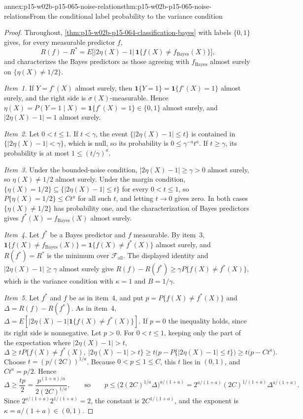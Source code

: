 \begin{annexitem}{annex:p15-w02b-p15-065-noise-relations}{thm:p15-w02b-p15-065-noise-relations}{From the conditional label probability to the variance condition}
\begin{proof}
Throughout, \cref{thm:p15-w02b-p15-064-classification-bayes} with labels
\(\{0,1\}\) gives, for every measurable predictor \(f\),
\begin{equation*}
 R(f)-R^{*}=E\bigl[|2\eta(X)-1|\,\mathbf1\{f(X)\ne f_{\mathrm{Bayes}}(X)\}\bigr],
\end{equation*}
and characterizes the Bayes predictors as those agreeing with
\(f_{\mathrm{Bayes}}\) almost surely on \(\{\eta(X)\ne1/2\}\).

\emph{Item~1.} If \(Y=f^{\circ}(X)\) almost surely, then
\(\mathbf1\{Y=1\}=\mathbf1\{f^{\circ}(X)=1\}\) almost surely, and the right
side is \(\sigma(X)\)-measurable. Hence
\(\eta(X)=P(Y=1\mid X)=\mathbf1\{f^{\circ}(X)=1\}\in\{0,1\}\) almost
surely, and \(|2\eta(X)-1|=1\) almost surely.

\emph{Item~2.} Let \(0<t\leq1\). If \(t<\gamma\), the event
\(\{|2\eta(X)-1|\leq t\}\) is contained in \(\{|2\eta(X)-1|<\gamma\}\),
which is null, so its probability is \(0\leq\gamma^{-a}t^{a}\). If
\(t\geq\gamma\), its probability is at most \(1\leq(t/\gamma)^{a}\).

\emph{Item~3.} Under the bounded-noise condition,
\(|2\eta(X)-1|\geq\gamma>0\) almost surely, so \(\eta(X)\ne1/2\) almost
surely. Under the margin condition,
\(\{\eta(X)=1/2\}\subseteq\{|2\eta(X)-1|\leq t\}\) for every
\(0<t\leq1\), so \(P\{\eta(X)=1/2\}\leq Ct^{a}\) for all such \(t\), and
letting \(t\to0\) gives zero. In both cases \(\{\eta(X)\ne1/2\}\) has
probability one, and the characterization of Bayes predictors gives
\(f^{*}(X)=f_{\mathrm{Bayes}}(X)\) almost surely.

\emph{Item~4.} Let \(f^{*}\) be a Bayes predictor and \(f\) measurable.
By item~3, \(\mathbf1\{f(X)\ne f_{\mathrm{Bayes}}(X)\}=
\mathbf1\{f(X)\ne f^{*}(X)\}\) almost surely, and \(R(f^{*})=R^{*}\) is
the minimum over \(\mathcal F_{\mathrm{all}}\). The displayed identity and
\(|2\eta(X)-1|\geq\gamma\) almost surely give
\(R(f)-R(f^{*})\geq\gamma P\{f(X)\ne f^{*}(X)\}\), which is the variance
condition with \(\kappa=1\) and \(B=1/\gamma\).

\emph{Item~5.} Let \(f^{*}\) and \(f\) be as in item~4, and put
\(p=P\{f(X)\ne f^{*}(X)\}\) and \(\Delta=R(f)-R(f^{*})\). As in item~4,
\(\Delta=E[|2\eta(X)-1|\mathbf1\{f(X)\ne f^{*}(X)\}]\). If \(p=0\) the
inequality holds, since its right side is nonnegative. Let \(p>0\). For
\(0<t\leq1\), keeping only the part of the expectation where
\(|2\eta(X)-1|>t\),
\[
 \Delta\geq tP\{f(X)\ne f^{*}(X),\ |2\eta(X)-1|>t\}
 \geq t\bigl(p-P\{|2\eta(X)-1|\leq t\}\bigr)\geq t\bigl(p-Ct^{a}\bigr).
\]
Choose \(t=(p/(2C))^{1/a}\). Because \(0<p\leq1\leq C\), this \(t\) lies in
\((0,1)\), and \(Ct^{a}=p/2\). Hence
\[
 \Delta\geq\frac{tp}2=\frac{p^{(1+a)/a}}{2(2C)^{1/a}},
 \qquad\text{so}\qquad
 p\leq\bigl(2(2C)^{1/a}\Delta\bigr)^{a/(1+a)}
 =2^{a/(1+a)}(2C)^{1/(1+a)}\Delta^{a/(1+a)}.
\]
Since \(2^{a/(1+a)}2^{1/(1+a)}=2\), the constant is \(2C^{1/(1+a)}\), and
the exponent is \(\kappa=a/(1+a)\in(0,1)\).


\end{proof}
\end{annexitem}
